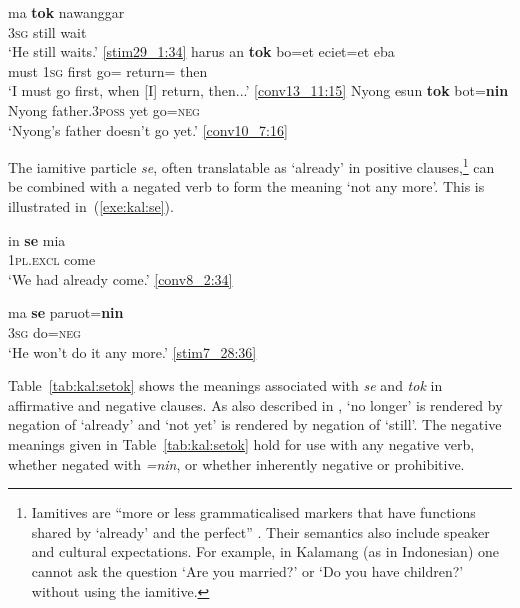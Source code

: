 \documentclass[output=paper,colorlinks,citecolor=brown,draft]{langscibook}
\begin{document}
\ea \label{exe:kal:tok}
\ea \label{exe:kal:tokna}
 	\gll ma \textbf{tok} nawanggar\\
 	\textsc{3sg} still wait\\
 	\glt `He still waits.' {\href{http://hdl.handle.net/10050/00-0000-0000-0004-1BD4-C}{[stim29\_1:34]}}
\ex \label{exe:kal:harustok}
 	\gll harus an \textbf{tok} bo=et eciet=et eba\\
	must \textsc{1sg} first go={\glet} return={\glet} then\\
	\glt `I must go first, when [I] return, then...' {\href{http://hdl.handle.net/10050/00-0000-0000-0004-1BA6-6}{[conv13\_11:15]}}
\ex \label{exe:kal:tokbotnin}
	\gll Nyong esun \textbf{tok} bot=\textbf{nin} \\ 
 	Nyong father.\textsc{3poss} yet go=\textsc{neg} \\
 	\glt `Nyong's father doesn't go yet.' {\href{http://hdl.handle.net/10050/00-0000-0000-0004-1BA3-3}{[conv10\_7:16]}} 
\z \z

The iamitive particle \textit{se}, often translatable as `already' in positive clauses,\footnote{Iamitives are ``more or less grammaticalised markers that have functions shared by `already' and the perfect'' \citep[][4]{Olsson2013}. Their semantics also include speaker and cultural expectations. For example, in Kalamang (as in Indonesian) one cannot ask the question `Are you married?' or `Do you have children?' without using the iamitive.} can be combined with a negated verb to form the meaning `not any more'. This is illustrated in~(\ref{exe:kal:se}). 
 
\ea \label{exe:kal:se}
\ea \label{exe:kal:inse}
 {\gll in \textbf{se} mia\\
 	\textsc{1pl.excl} {\glse} come\\
 	\glt `We had already come.' {\href{http://hdl.handle.net/10050/00-0000-0000-0004-1BDC-D}{[conv8\_2:34]}}}
 
\ex 	\label{exe:kal:heparuotnin}
 {\gll ma \textbf{se} paruot=\textbf{nin}\\
 	\textsc{3sg} {\glse} do=\textsc{neg}\\
 	\glt `He won't do it any more.' {\href{http://hdl.handle.net/10050/00-0000-0000-0004-1BAA-C}{[stim7\_28:36]}}}
\z \z 
 
Table~\ref{tab:kal:setok} shows the meanings associated with \textit{se} and \textit{tok} in affirmative and negative clauses. As also described in \cite{Baar1997}, `no longer' is rendered by negation of `already' and `not yet' is rendered by negation of `still'. The negative meanings given in Table~\ref{tab:kal:setok} hold for use with any negative verb, whether negated with \textit{=nin}, or whether inherently negative or prohibitive.
 
\end{document}
